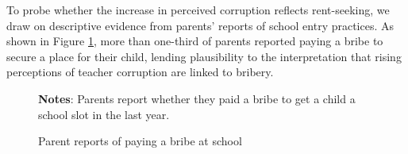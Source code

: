 \documentclass[hidelinks,12pt]{article}
\begin{document}
\begin{singlespace}
To probe whether the increase in perceived corruption reflects rent-seeking, we draw on descriptive evidence from parents’ reports of school entry practices. As shown in Figure \ref{fig:paid_bribe_sch_yr}, more than one-third of parents reported paying a bribe to secure a place for their child, lending plausibility to the interpretation that rising perceptions of teacher corruption are linked to bribery.

\begin{singlespace}
\begin{figure}[h]
\centering
\caption{Parent reports of paying a bribe at school}\label{fig:paid_bribe_sch_yr}
\begin{minipage}{0.6\linewidth}
\vspace{3pt}
\footnotesize{\justify\textbf{Notes}: Parents report whether they paid a bribe to get a child a school slot in the last year.}
\end{minipage}
\end{figure}
\end{singlespace}


\end{singlespace}

\clearpage

\singlespacing


\printbibliography[title={References}] \pagebreak 
\end{document}
